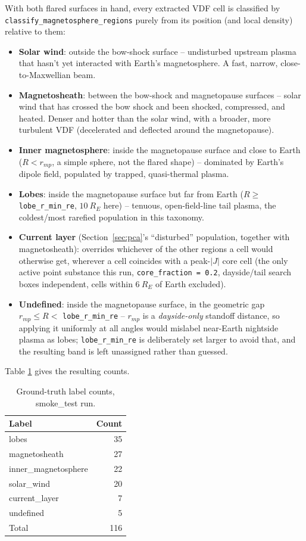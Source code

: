 \documentclass[11pt]{article}
\begin{document}
With both flared surfaces in hand, every extracted VDF cell is
classified by \texttt{classify\_magnetosphere\_regions} purely from its
position (and local density) relative to them:
\begin{itemize}
  \item \textbf{Solar wind}: outside the bow-shock surface -- undisturbed
  upstream plasma that hasn't yet interacted with Earth's magnetosphere.
  A fast, narrow, close-to-Maxwellian beam.
  \item \textbf{Magnetosheath}: between the bow-shock and magnetopause
  surfaces -- solar wind that has crossed the bow shock and been shocked,
  compressed, and heated. Denser and hotter than the solar wind, with a
  broader, more turbulent VDF (decelerated and deflected around the
  magnetopause).
  \item \textbf{Inner magnetosphere}: inside the magnetopause surface and
  close to Earth ($R < r_{mp}$, a simple sphere, not the flared shape) --
  dominated by Earth's dipole field, populated by trapped, quasi-thermal
  plasma.
  \item \textbf{Lobes}: inside the magnetopause surface but far from Earth
  ($R \geq$ \texttt{lobe\_r\_min\_re}, $10~R_E$ here) -- tenuous,
  open-field-line tail plasma, the coldest/most rarefied population in
  this taxonomy.
  \item \textbf{Current layer} (Section~\ref{sec:pca}'s ``disturbed''
  population, together with magnetosheath): overrides whichever of the
  other regions a cell would otherwise get, wherever a cell coincides
  with a peak-$|J|$ core cell (the only active point substance this run,
  \texttt{core\_fraction~=~0.2}, dayside/tail search boxes independent,
  cells within $6~R_E$ of Earth excluded).
  \item \textbf{Undefined}: inside the magnetopause surface, in the
  geometric gap $r_{mp} \leq R < $ \texttt{lobe\_r\_min\_re} -- $r_{mp}$ is a
  \emph{dayside-only} standoff distance, so applying it uniformly at all
  angles would mislabel near-Earth nightside plasma as lobes;
  \texttt{lobe\_r\_min\_re} is deliberately set larger to avoid that, and
  the resulting band is left unassigned rather than guessed.
\end{itemize}
Table \ref{tab:label-counts} gives the resulting counts.

\begin{table}[h]
\centering
\begin{tabular}{lr}
\toprule
Label & Count \\
\midrule
lobes & 35 \\
magnetosheath & 27 \\
inner\_magnetosphere & 22 \\
solar\_wind & 20 \\
current\_layer & 7 \\
undefined & 5 \\
\midrule
Total & 116 \\
\bottomrule
\end{tabular}
\caption{Ground-truth label counts, smoke\_test run.}
\label{tab:label-counts}
\end{table}
\end{document}
